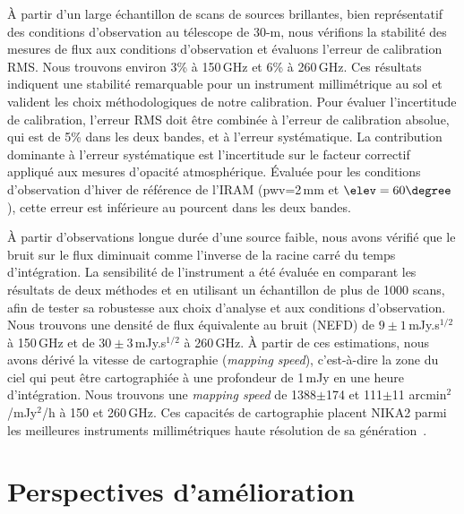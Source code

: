 \`A partir d'un large échantillon de scans de sources
brillantes, bien représentatif des conditions d'observation au
télescope de 30-m, nous vérifions la stabilité des mesures de flux aux
conditions d'observation et évaluons l'erreur de calibration RMS. Nous
trouvons environ 3\% à 150\,GHz et 6\% à 260\,GHz. Ces résultats
indiquent une stabilité remarquable pour un instrument millimétrique
au sol et valident les choix méthodologiques de notre
calibration. Pour évaluer l'incertitude de calibration, l'erreur RMS
doit être combinée à l'erreur de calibration absolue, qui est de 5\%
dans les deux bandes, et à l'erreur systématique. La contribution
dominante à l'erreur systématique est l'incertitude sur le facteur
correctif appliqué aux mesures d'opacité atmosphérique. \'Evaluée pour
les conditions d'observation d'hiver de référence de l'IRAM (pwv=2\,mm
et $\elev = 60\degree$), cette erreur est inférieure au pourcent dans
les deux bandes.

\`A partir d'observations longue durée d'une source faible, nous avons
vérifié que le bruit sur le flux diminuait comme l'inverse de la
racine carré du temps d'intégration. La sensibilité de l'instrument a
été évaluée en comparant les résultats de deux méthodes et en
utilisant un échantillon de plus de 1000 scans, afin de
tester sa robustesse aux choix d'analyse et aux conditions
d'observation.
Nous trouvons une densité de flux équivalente au bruit (NEFD) de
$9\pm1$\,mJy.s$^{1/2}$ à 150\,GHz et de $30\pm3$\,mJy.s$^{1/2}$ à
260\,GHz. \`A partir de ces estimations, nous avons dérivé la vitesse
de cartographie (\emph{mapping speed}), c'est-à-dire la zone du ciel
qui peut être cartographiée à une profondeur de 1\,mJy en une heure
d'intégration. Nous trouvons une \emph{mapping speed} de 1388$\pm$174
et 111$\pm$11 arcmin$^2$/mJy$^2$/h à 150 et 260\,GHz. Ces capacités de
cartographie placent NIKA2 parmi les meilleures instruments
millimétriques haute résolution de sa génération~\citep{Tony2019}.



\section{Perspectives d'amélioration}


